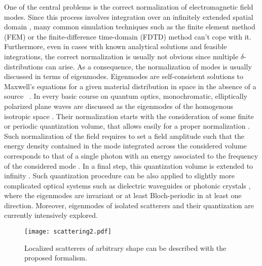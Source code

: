\documentclass[10pt,letterpaper]{article}
\begin{document}
One of the central problems is the correct normalization of electromagnetic field modes. Since this process involves integration over an infinitely extended spatial domain \cite{Vogel1994}, many common simulation techniques such as the finite element method (FEM) or the finite-difference time-domain (FDTD) method can't cope with it. Furthermore, even in cases with known analytical solutions and feasible integrations, the correct normalization is usually not obvious since multiple $\delta$-distributions can arise. As a consequence, the normalization of modes is usually discussed in terms of eigenmodes. Eigenmodes are self-consistent solutions to Maxwell's equations for a given material distribution in space in the absence of a source~ \cite{jackson1975electrodynamics, desoer2009basic, Huttner1991}. In every basic course on quantum optics, monochromatic, elliptically polarized plane waves are discussed as the eigenmodes of the homogenous isotropic space \cite{grynberg2010introduction, mandel1995optical}. Their normalization starts with the consideration of some finite or periodic quantization volume, that allows easily for a proper normalization \cite{loudon2000quantum, haroche2006exploring}. Such normalization of the field requires to set a field amplitude such that the energy density contained in the mode integrated across the considered volume corresponds to that of a single photon with an energy associated to the frequency of the considered mode \cite{walls2007quantum, Fetter}. In a final step, this quantization volume is extended to infinity \cite{scully1999quantum}. Such quantization procedure can be also applied to slightly more complicated optical systems such as dielectric waveguides \cite{teich1991fundamentals} or photonic crystals \cite{joannopoulos2011photonic, de2014roundtrip}, where the eigenmodes are invariant or at least Bloch-periodic in at least one direction. Moreover, eigenmodes of isolated scatterers \cite{bryant2008mapping, bai2013efficient, kristensen2013modes, makitalo2014modes, doost2014resonant, ge2015quasi, vial2016coupling} and their quantization \cite{ge2015quantum} are currently intensively explored.

\begin{figure}
\begin{center}
\texttt{[image: scattering2.pdf]}
\end{center}
\caption{Localized scatterers of arbitrary shape can be described with the proposed formalism. \label{fig:kit_scatteringPIC}}
\end{figure}
\end{document}

